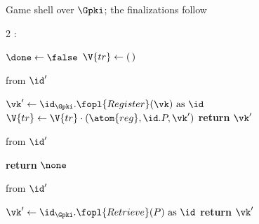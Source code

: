 \documentclass[10pt,oneside,openany]{book}
\theoremstyle{accentdef}
\theoremstyle{accentplain}
\begin{document}
\begin{interface}[nofloat]{Game shell over $\Gpki$; the finalizations follow \\
}

{\scriptsize
\setlength{\columnsep}{1.4em}
\begin{multicols}{2}
:
\begin{algorithmic}[1]
\setcounter{contline}{0}\algcont
\State $\done \gets \false$
\State $\V{tr} \gets (\,)$
\algsave
\end{algorithmic}
\vspace{1.4ex}

 \quad from $\id'$
\begin{algorithmic}[1]
\algcont
\Req{$\neg\done$}
\State $\vk' \gets \id_{\Gpki}.\fopl{Register}(\vk) \text{ as } \id$ \label{ln:gpkireg}
\State $\V{tr} \gets \V{tr} \cdot (\atom{reg},\id.P,\vk')$
\State \textbf{return} $\vk'$
\algsave
\end{algorithmic}
\vspace{1.4ex}

 \quad from $\id'$
\begin{algorithmic}[1]
\algcont
\State \textbf{return} $\none$
\algsave
\end{algorithmic}

\columnbreak

 \quad from $\id'$
\begin{algorithmic}[1]
\algcont
\Req{$\neg\done$}
\State $\vk' \gets \id_{\Gpki}.\fopl{Retrieve}(P) \text{ as } \id$
\State \textbf{return} $\vk'$
\algsave
\end{algorithmic}
\vspace{1.4ex}

\end{multicols}}
\end{interface}
\end{document}
